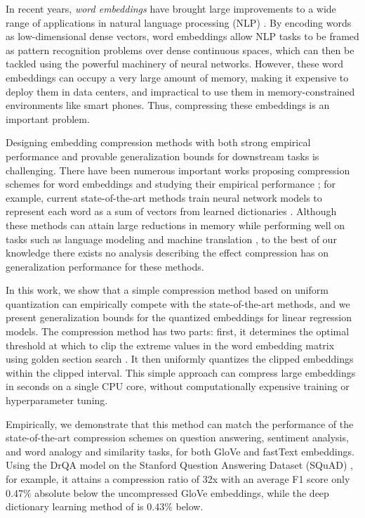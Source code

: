 In recent years, \textit{word embeddings} \citep{word2vec13,glove14,fasttext18} have brought large improvements to a wide range of applications in natural language processing (NLP) \citep{collins16,drqa17}.
By encoding words as low-dimensional dense vectors, word embeddings allow NLP tasks to be framed as pattern recognition problems over dense continuous spaces, which can then be tackled using the powerful machinery of neural networks.
However, these word embeddings can occupy a very large amount of memory, making it expensive to deploy them in data centers, and impractical to use them in memory-constrained environments like smart phones.
Thus, compressing these embeddings is an important problem.

Designing embedding compression methods with both strong empirical performance and provable generalization bounds for downstream tasks is challenging.
There have been numerous important works proposing compression schemes for word embeddings and studying their empirical performance \citep{sparse16,andrews16,dccl17,kway18};
for example, current state-of-the-art methods train neural network models to represent each word as a sum of vectors from learned dictionaries \citep{dccl17}.
Although these methods can attain large reductions in memory while performing well on tasks such as language modeling \citep{mikolov10} and machine translation \citep{bahdanau15}, to the best of our knowledge there exists no analysis describing the effect compression has on generalization performance for these methods.

In this work, we show that a simple compression method based on uniform quantization can empirically compete with the state-of-the-art methods, and we present generalization bounds for the quantized embeddings for linear regression models.
The compression method has two parts: first, it determines the optimal threshold at which to clip the extreme values in the word embedding matrix using golden section search \citep{golden53}.
It then uniformly quantizes the clipped embeddings within the clipped interval.
This simple approach can compress large embeddings in seconds on a single CPU core, without computationally expensive training or hyperparameter tuning.

Empirically, we demonstrate that this method can match the performance of the state-of-the-art compression schemes on question answering, sentiment analysis, and word analogy and similarity tasks, for both GloVe \citep{glove14} and fastText \citep{fasttext18} embeddings.
Using the DrQA model \citep{drqa17} on the Stanford Question Answering Dataset (SQuAD) \citep{squad16}, for example, it attains a compression ratio of 32x with an average F1 score only 0.47\% absolute below the uncompressed GloVe embeddings, while the deep dictionary learning method of \citet{dccl17} is 0.43\% below.

